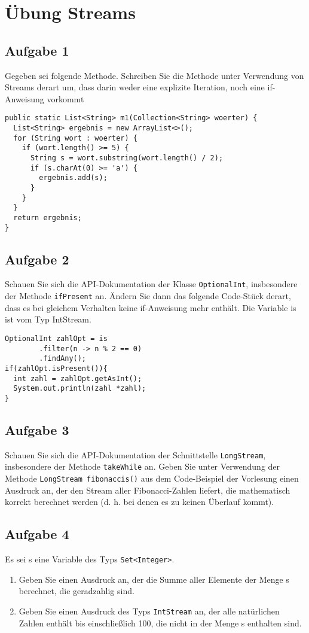 \chapter{Übung Streams}

\section{Aufgabe 1}
Gegeben sei folgende Methode. Schreiben Sie die Methode unter Verwendung von
Streams derart um, dass darin weder eine explizite Iteration, noch eine
if-Anweisung vorkommt

\begin{lstlisting}
public static List<String> m1(Collection<String> woerter) {
  List<String> ergebnis = new ArrayList<>();
  for (String wort : woerter) {
    if (wort.length() >= 5) {
      String s = wort.substring(wort.length() / 2);
      if (s.charAt(0) >= 'a') {
        ergebnis.add(s);
      }
    }
  }
  return ergebnis;
}
\end{lstlisting}

\section{Aufgabe 2}
Schauen Sie sich die API-Dokumentation der Klasse \lstinline{OptionalInt}, insbesondere der
Methode \lstinline{ifPresent} an. Ändern Sie dann das folgende Code-Stück derart, dass es
bei gleichem Verhalten keine if-Anweisung mehr enthält. Die Variable is ist vom
Typ IntStream.

\begin{lstlisting}
OptionalInt zahlOpt = is
        .filter(n -> n % 2 == 0)
        .findAny();
if(zahlOpt.isPresent()){
  int zahl = zahlOpt.getAsInt();
  System.out.println(zahl *zahl);
}
\end{lstlisting}

\section{Aufgabe 3}
Schauen Sie sich die API-Dokumentation der Schnittstelle \lstinline{LongStream},
insbesondere der Methode \lstinline{takeWhile} an. Geben Sie unter Verwendung der Methode
\lstinline{LongStream fibonaccis()} aus dem Code-Beispiel der Vorlesung einen Ausdruck an,
der den Stream aller Fibonacci-Zahlen liefert, die mathematisch korrekt
berechnet werden (d. h. bei denen es zu keinen Überlauf kommt).

\section{Aufgabe 4}
Es sei s eine Variable des Typs \lstinline{Set<Integer>}.
\begin{enumerate}
    \item Geben Sie einen Ausdruck an, der die Summe aller Elemente der Menge s
          berechnet, die geradzahlig sind.
    \item Geben Sie einen Ausdruck des Typs \lstinline{IntStream} an, der alle natürlichen Zahlen
          enthält bis einschließlich 100, die nicht in der Menge s enthalten sind.
\end{enumerate}

